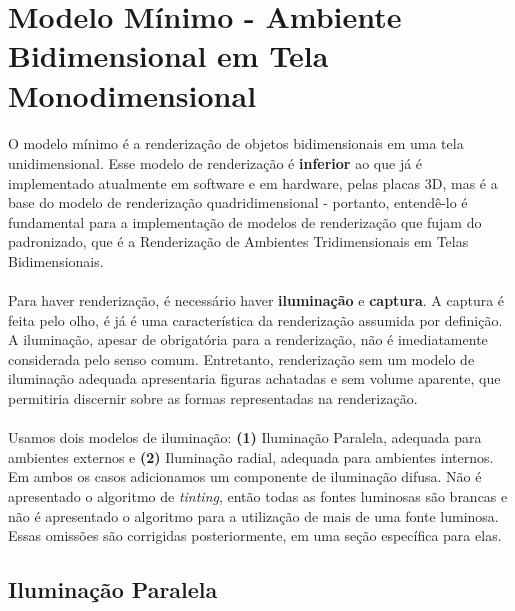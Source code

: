 \documentclass{article}
\begin{document}
	\section{Modelo Mínimo - Ambiente Bidimensional em Tela Monodimensional}
	
	\paragraph{}
	O modelo mínimo é a renderização de objetos bidimensionais em uma tela unidimensional. Esse modelo de renderização é \textbf{inferior} ao que já é implementado atualmente em software e em hardware, pelas placas 3D, mas é a base do modelo de renderização quadridimensional - portanto, entendê-lo é fundamental para a implementação de modelos de renderização que fujam do padronizado, que é a Renderização de Ambientes Tridimensionais em Telas Bidimensionais.
	
	\paragraph{}
	Para haver renderização, é necessário haver \textbf{iluminação} e \textbf{captura}. A captura é feita pelo olho, é já é uma característica da renderização assumida por definição. A iluminação, apesar de obrigatória para a renderização, não é imediatamente considerada pelo senso comum. Entretanto, renderização sem um modelo de iluminação adequada apresentaria figuras achatadas e sem volume aparente, que permitiria discernir sobre as formas representadas na renderização.
	
	\paragraph{}
	Usamos dois modelos de iluminação: \textbf{(1)} Iluminação Paralela, adequada para ambientes externos e \textbf{(2)} Iluminação radial, adequada para ambientes internos. Em ambos os casos adicionamos um componente de iluminação difusa. Não é apresentado o algoritmo de \textit{tinting}, então todas as fontes luminosas são brancas e não é apresentado o algoritmo para a utilização de mais de uma fonte luminosa. Essas omissões são corrigidas posteriormente, em uma seção específica para elas.
	
	\subsection{Iluminação Paralela}
	
\end{document}
